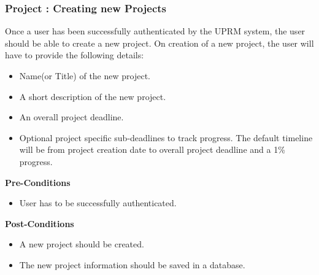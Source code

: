 \subsubsection{Project : Creating new Projects}
	Once a user has been successfully authenticated by the UPRM system, the user should be able to create a new project. On creation of a new project, the user will have to provide the following details:
	\begin{itemize}
		\item Name(or Title) of the new project.
		\item A short description of the new project.
		\item An overall project deadline.
		\item Optional project specific sub-deadlines to track progress. The default timeline will be from project creation date to overall project deadline and a 1\% progress.
	\end{itemize}
	\textbf{Pre-Conditions}
	\begin{itemize}
		\item User has to be successfully authenticated.
	\end{itemize}
	\textbf{Post-Conditions}
	\begin{itemize}
		\item A new project should be created.
		\item The new project information should be saved in a database.
	\end{itemize}
	
	\centerline{}